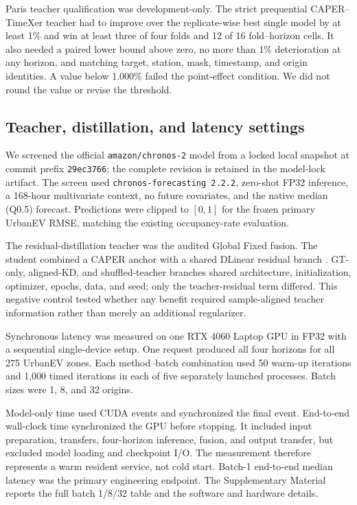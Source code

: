Paris teacher qualification was development-only.  The strict prequential CAPER--TimeXer teacher had to improve over the replicate-wise best single model by at least 1\% and win at least three of four folds and 12 of 16 fold--horizon cells.  It also needed a paired lower bound above zero, no more than 1\% deterioration at any horizon, and matching target, station, mask, timestamp, and origin identities.  A value below 1.000\% failed the point-effect condition.  We did not round the value or revise the threshold.

\subsection{Teacher, distillation, and latency settings}
\label{sec:methods-downstream}

We screened the official \texttt{amazon/chronos-2} model \cite{ansari2025chronos2} from a locked local snapshot at commit prefix \texttt{29ec3766}; the complete revision is retained in the model-lock artifact.  The screen used \texttt{chronos-forecasting 2.2.2}, zero-shot FP32 inference, a 168-hour multivariate context, no future covariates, and the native median (Q0.5) forecast.  Predictions were clipped to $[0,1]$ for the frozen primary UrbanEV RMSE, matching the existing occupancy-rate evaluation.

The residual-distillation teacher was the audited Global Fixed fusion.  The student combined a CAPER anchor with a shared DLinear residual branch \cite{zeng2023dlinear}.  GT-only, aligned-KD, and shuffled-teacher branches shared architecture, initialization, optimizer, epochs, data, and seed; only the teacher-residual term differed.  This negative control tested whether any benefit required sample-aligned teacher information rather than merely an additional regularizer.

Synchronous latency was measured on one RTX 4060 Laptop GPU in FP32 with a sequential single-device setup.  One request produced all four horizons for all 275 UrbanEV zones.  Each method--batch combination used 50 warm-up iterations and 1,000 timed iterations in each of five separately launched processes.  Batch sizes were 1, 8, and 32 origins.

Model-only time used CUDA events and synchronized the final event.  End-to-end wall-clock time synchronized the GPU before stopping.  It included input preparation, transfers, four-horizon inference, fusion, and output transfer, but excluded model loading and checkpoint I/O.  The measurement therefore represents a warm resident service, not cold start.  Batch-1 end-to-end median latency was the primary engineering endpoint.  The Supplementary Material reports the full batch 1/8/32 table and the software and hardware details.


